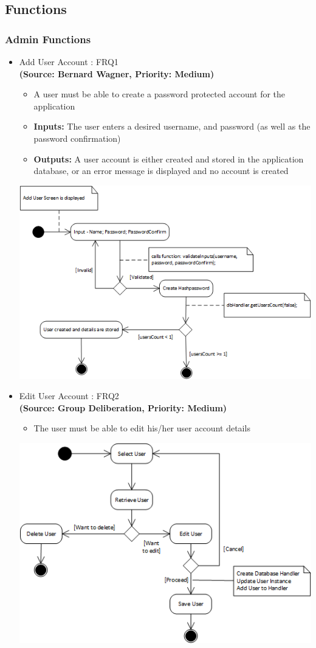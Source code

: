 \subsection{Functions}
\subsubsection{Admin Functions}
\begin{itemize}
\item{Add User Account : FRQ1}\\
\textbf{(Source: Bernard Wagner, Priority: Medium)}
\begin{itemize}
\item A user must be able to create a password protected account for the application
\item \textbf{Inputs:} The user enters a desired username, and password (as well as the password confirmation)
\item \textbf{Outputs:} A user account is either created and stored in the application database, or an error message is displayed and no account is created
\end{itemize}
 \includegraphics[width=13cm]{diagrams/StateDiagrams/AddUserStateDiagram.png}
\item{Edit User Account : FRQ2}\\
\textbf{(Source: Group Deliberation, Priority: Medium)}
\begin{itemize}
\item The user must be able to edit his/her user account details
\end{itemize}
 \includegraphics[width=13cm]{diagrams/StateDiagrams/EditUserStateDiagram.png}

\end{itemize}
